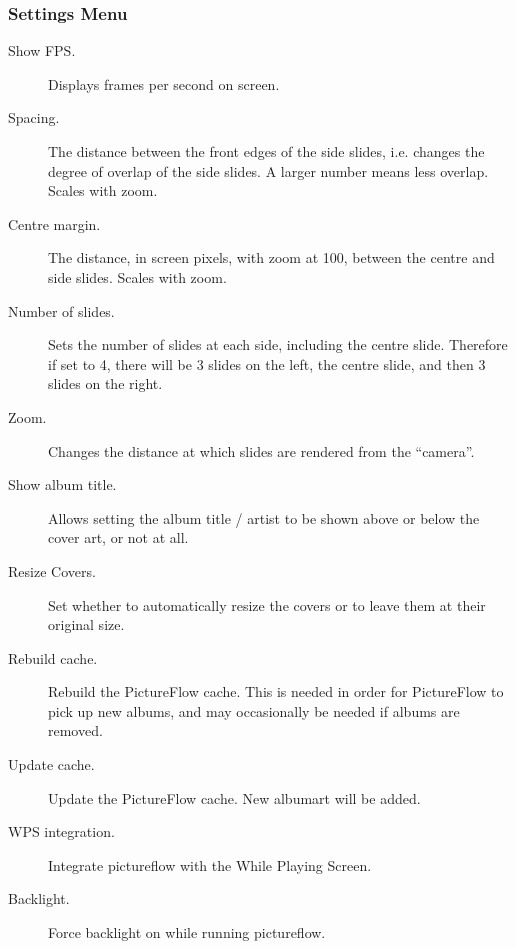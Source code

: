 \subsubsection{Settings Menu}

\begin{description}
  \item[Show FPS.] Displays frames per second on screen.
  \item[Spacing.] The distance between the front edges of the side slides, i.e. changes
  the degree of overlap of the side slides. A larger number means less overlap. Scales with zoom.
  \item[Centre margin.] The distance, in screen pixels, with zoom at 100, between
  the centre and side slides. Scales with zoom.
  \item[Number of slides.] Sets the number of slides at each side, including the
  centre slide. Therefore if set to 4, there will be 3 slides on the left,
  the centre slide, and then 3 slides on the right.
  \item[Zoom.] Changes the distance at which slides are rendered from the ``camera''.
  \item[Show album title.] Allows setting the album title / artist to be
  shown above or below the cover art, or not at all.
  \item[Resize Covers.] Set whether to automatically resize the covers or to leave
  them at their original size.
  \item[Rebuild cache.] Rebuild the PictureFlow cache. This is needed in order
  for PictureFlow to pick up new albums, and may occasionally be needed if albums
  are removed.
  \item[Update cache.] Update the PictureFlow cache. New albumart will be added.
  \item[WPS integration.] Integrate pictureflow with the While Playing Screen.
  \item[Backlight.] Force backlight on while running pictureflow.
\end{description}
